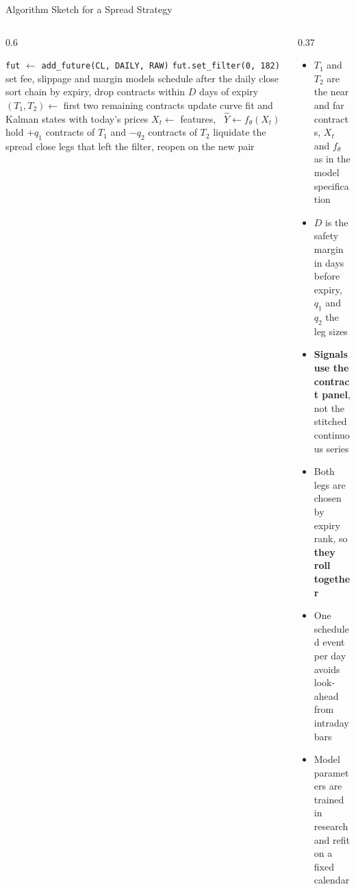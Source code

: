 \documentclass[10pt, aspectratio=169]{beamer}
\newcommand{\key}[1]{\textcolor{accent}{\textbf{#1}}}
\begin{document}
\begin{frame}[fragile]{Algorithm Sketch for a Spread Strategy}
\begin{columns}[T, onlytextwidth]
\begin{column}{0.6\textwidth}
\begin{algorithm}[H]
\caption{Daily calendar spread strategy in LEAN}
\scriptsize
\begin{algorithmic}[1]
  \State \texttt{fut} $\gets$ \texttt{add\_future(CL, DAILY, RAW)}
  \State \texttt{fut.set\_filter(0, 182)} 
  \State set fee, slippage and margin models
  \State schedule  after the daily close
\EndProcedure
{}
  \State sort chain by expiry, drop contracts within $D$ days of expiry
  \State $(T_1, T_2) \gets$ first two remaining contracts
  \State update curve fit and Kalman states with today's prices
  \State $X_t \gets$ features, \ $\hat Y \gets f_{\theta}(X_t)$
    \State hold $+q_1$ contracts of $T_1$ and $-q_2$ contracts of $T_2$
  \Else
    \State liquidate the spread
  \EndIf
\EndProcedure
{}
  \State close legs that left the filter, reopen on the new pair
\EndProcedure
\end{algorithmic}
\end{algorithm}
\end{column}
\begin{column}{0.37\textwidth}
\begin{itemize}\footnotesize
  \item $T_1$ and $T_2$ are the near and far contracts, $X_t$ and $f_\theta$ as in the model specification
  \item $D$ is the safety margin in days before expiry, $q_1$ and $q_2$ the leg sizes
  \item \key{Signals use the contract panel}, not the stitched continuous series
  \item Both legs are chosen by expiry rank, so \key{they roll together}
  \item One scheduled event per day avoids look-ahead from intraday bars
  \item Model parameters are trained in research and refit on a fixed calendar
\end{itemize}
\end{column}
\end{columns}
\end{frame}

\end{document}

